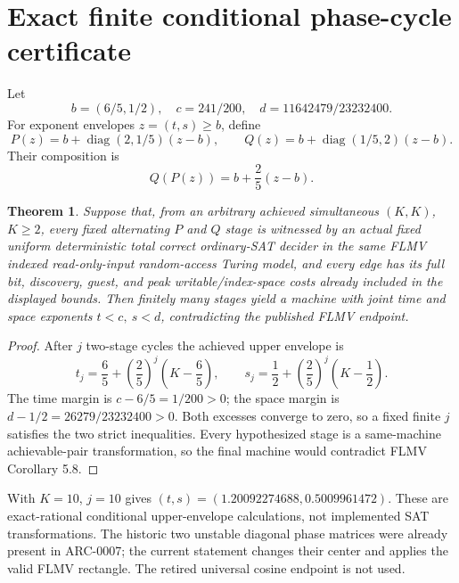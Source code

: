 \documentclass[11pt]{article}
\newtheorem{theorem}{Theorem}
\begin{document}
\section{Exact finite conditional phase-cycle certificate}
Let
\[
 b=(6/5,1/2),\quad c=241/200,\quad
 d=11642479/23232400.
\]
For exponent envelopes \(z=(t,s)\ge b\), define
\[
 P(z)=b+\operatorname{diag}(2,1/5)(z-b),\qquad
 Q(z)=b+\operatorname{diag}(1/5,2)(z-b).
\]
Their composition is
\[
 Q(P(z))=b+\frac25(z-b).
\]
\begin{theorem}
Suppose that, from an arbitrary achieved simultaneous
\((K,K)\), \(K\ge2\), every fixed alternating \(P\) and
\(Q\) stage is witnessed by an actual fixed uniform deterministic
total correct ordinary-SAT decider in the same FLMV indexed
read-only-input random-access Turing model, and every edge
has its full bit, discovery, guest, and peak writable/index-space
costs already included in the displayed bounds.
Then finitely many stages yield a machine with joint
time and space exponents \(t<c,\ s<d\), contradicting
the published FLMV endpoint.
\end{theorem}
\begin{proof}
After \(j\) two-stage cycles the achieved upper envelope is
\[
 t_j=\frac65+\left(\frac25\right)^j
 \left(K-\frac65\right),\qquad
 s_j=\frac12+\left(\frac25\right)^j
 \left(K-\frac12\right).
\]
The time margin is \(c-6/5=1/200>0\);
the space margin is \(d-1/2=26279/23232400>0\).
Both excesses converge to zero, so a fixed finite \(j\)
satisfies the two strict inequalities. Every hypothesized
stage is a same-machine achievable-pair transformation, so
the final machine would contradict FLMV Corollary 5.8.
\end{proof}
With \(K=10\), \(j=10\) gives
\((t,s)=(1.20092274688,0.5009961472)\).
These are exact-rational conditional upper-envelope calculations,
not implemented SAT transformations.
The historic two unstable diagonal phase matrices were
already present in ARC-0007; the current statement changes
their center and applies the valid FLMV rectangle.
The retired universal cosine endpoint is not used.
\end{document}
